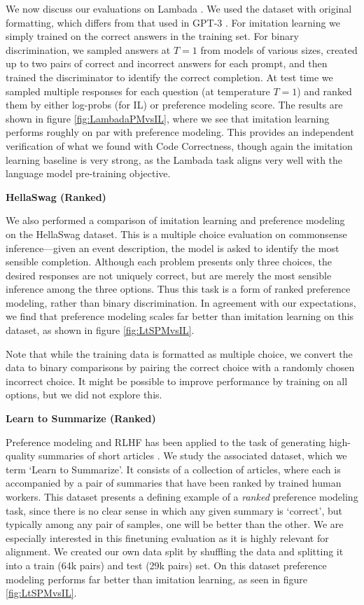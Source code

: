 We now discuss our evaluations on Lambada \cite{paperno2016lambada}. We used the dataset with original formatting, which differs from that used in GPT-3 \cite{brown2020language}. For imitation learning we simply trained on the correct answers in the training set.  For binary discrimination, we sampled answers at $T=1$ from models of various sizes, created up to two pairs of correct and incorrect answers for each prompt, and then trained the discriminator to identify the correct completion.  At test time we sampled multiple responses for each question (at temperature $T=1$) and ranked them by either log-probs (for IL) or preference modeling score. The results are shown in figure \ref{fig:LambadaPMvsIL}, where we see that imitation learning performs roughly on par with preference modeling.  This provides an independent verification of what we found with Code Correctness, though again the imitation learning baseline is very strong, as the Lambada task aligns very well with the language model pre-training objective.  

{\bf HellaSwag (Ranked)}

We also performed a comparison of imitation learning and preference modeling on the HellaSwag \cite{zellers2019hellaswag} dataset.  This is a multiple choice evaluation on commonsense inference---given an event description, the model is asked to identify the most sensible completion. Although each problem presents only three choices, the desired responses are not uniquely correct, but are merely the most sensible inference among the three options.  Thus this task is a form of ranked preference modeling, rather than binary discrimination.  In agreement with our expectations, we find that preference modeling scales far better than imitation learning on this dataset, as shown in figure \ref{fig:LtSPMvsIL}.

Note that while the training data is formatted as multiple choice, we convert the data to binary comparisons by pairing the correct choice with a randomly chosen incorrect choice.  It might be possible to improve performance by training on all options, but we did not explore this.

{\bf Learn to Summarize (Ranked)}

Preference modeling and RLHF has been applied to the task of generating high-quality summaries of short articles  \cite{stiennon2020learning}.  We study the associated dataset, which we term `Learn to Summarize'.  It consists of a collection of articles, where each is accompanied by a pair of summaries that have been ranked by trained human workers. This dataset presents a defining example of a {\it ranked} preference modeling task, since there is no clear sense in which any given summary is `correct', but typically among any pair of samples, one will be better than the other. We are especially interested in this finetuning evaluation as it is highly relevant for alignment. We created our own data split by shuffling the data and splitting it into a train (64k pairs) and test (29k pairs) set. On this dataset preference modeling performs far better than imitation learning, as seen in figure \ref{fig:LtSPMvsIL}.

